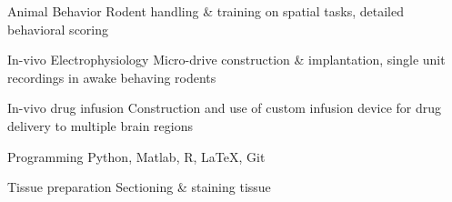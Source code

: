 

\begin{cvskills}

  \cvskill
    {Animal Behavior} %
    {Rodent handling \& training on spatial tasks, detailed behavioral scoring} %

  \cvskill
    {In-vivo Electrophysiology} %
    {Micro-drive construction \& implantation, single unit recordings in awake behaving rodents} %

  \cvskill
    {In-vivo drug infusion} %
    {Construction and use of custom infusion device for drug delivery to multiple brain regions} %

  \cvskill
    {Programming} %
    {Python, Matlab, R, \LaTeX, Git} %

  \cvskill
    {Tissue preparation} %
    {Sectioning \& staining tissue} %

\end{cvskills}




